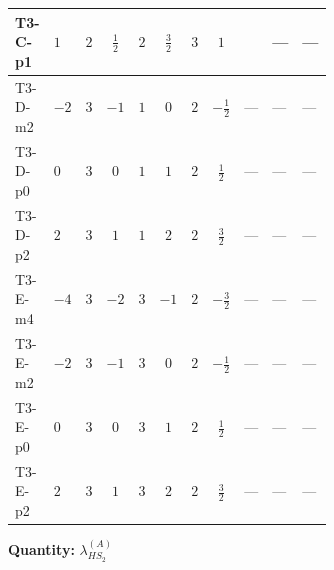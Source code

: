 \documentclass[8pt]{article}
\begin{document}
\begin{landscape}
\begin{longtable}{@{}llcccccc >{\raggedright\arraybackslash}p{0.21\linewidth} >{\raggedright\arraybackslash}p{0.21\linewidth} >{\raggedright\arraybackslash}p{0.21\linewidth}@{}}
\midrule
T3-C-p1 & $1$ & $2$ & $\frac{1}{2}$ & $2$ & $\frac{3}{2}$ & $3$ & $1$ & \scriptsize\adjustbox{max width=\linewidth}{$\begin{gathered} +{\lambda_{12}^{(A)}} {\lambda_{HS_1}^{(A)}}\end{gathered}$} & --- & --- \\
\midrule
T3-D-m2 & $-2$ & $3$ & $-1$ & $1$ & $0$ & $2$ & $-\frac{1}{2}$ & --- & --- & --- \\
\midrule
T3-D-p0 & $0$ & $3$ & $0$ & $1$ & $1$ & $2$ & $\frac{1}{2}$ & --- & --- & --- \\
\midrule
T3-D-p2 & $2$ & $3$ & $1$ & $1$ & $2$ & $2$ & $\frac{3}{2}$ & --- & --- & --- \\
\midrule
T3-E-m4 & $-4$ & $3$ & $-2$ & $3$ & $-1$ & $2$ & $-\frac{3}{2}$ & --- & --- & --- \\
\midrule
T3-E-m2 & $-2$ & $3$ & $-1$ & $3$ & $0$ & $2$ & $-\frac{1}{2}$ & --- & --- & --- \\
\midrule
T3-E-p0 & $0$ & $3$ & $0$ & $3$ & $1$ & $2$ & $\frac{1}{2}$ & --- & --- & --- \\
\midrule
T3-E-p2 & $2$ & $3$ & $1$ & $3$ & $2$ & $2$ & $\frac{3}{2}$ & --- & --- & --- \\
\midrule
\bottomrule
\end{longtable}
\clearpage
\noindent\textbf{Quantity: }$\lambda_{HS_2}^{(A)}$\par\smallskip

\end{landscape}
\end{document}
